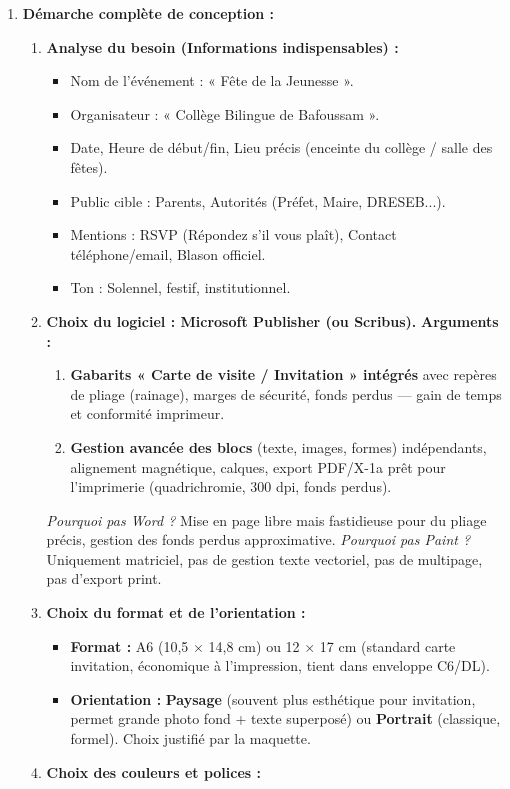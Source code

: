 \documentclass[11pt]{article}
\newcommand{\cle}[1]{{\popxbold\color{popdark}#1}}
\begin{document}
\begin{corrige}
\begin{enumerate}
\item \textbf{Démarche complète de conception :}
\begin{enumerate}
\item \textbf{Analyse du besoin (Informations indispensables) :}
\begin{itemize}
\item Nom de l'événement : « Fête de la Jeunesse ».
\item Organisateur : « Collège Bilingue de Bafoussam ».
\item Date, Heure de début/fin, Lieu précis (enceinte du collège / salle des fêtes).
\item Public cible : Parents, Autorités (Préfet, Maire, DRESEB...).
\item Mentions : RSVP (Répondez s'il vous plaît), Contact téléphone/email, Blason officiel.
\item Ton : Solennel, festif, institutionnel.
\end{itemize}
\item \textbf{Choix du logiciel : \cle{Microsoft Publisher} (ou Scribus).}
\textbf{Arguments :}
\begin{enumerate}
\item \textbf{Gabarits « Carte de visite / Invitation » intégrés} avec repères de pliage (rainage), marges de sécurité, fonds perdus — gain de temps et conformité imprimeur.
\item \textbf{Gestion avancée des blocs} (texte, images, formes) indépendants, alignement magnétique, calques, export PDF/X-1a prêt pour l'imprimerie (quadrichromie, 300 dpi, fonds perdus).
\end{enumerate}
\emph{Pourquoi pas Word ?} Mise en page libre mais fastidieuse pour du pliage précis, gestion des fonds perdus approximative. \emph{Pourquoi pas Paint ?} Uniquement matriciel, pas de gestion texte vectoriel, pas de multipage, pas d'export print.
\item \textbf{Choix du format et de l'orientation :}
\begin{itemize}
\item \textbf{Format :} A6 (10,5 $\times$ 14,8 cm) ou 12 $\times$ 17 cm (standard carte invitation, économique à l'impression, tient dans enveloppe C6/DL).
\item \textbf{Orientation :} \textbf{Paysage} (souvent plus esthétique pour invitation, permet grande photo fond + texte superposé) ou \textbf{Portrait} (classique, formel). Choix justifié par la maquette.
\end{itemize}
\item \textbf{Choix des couleurs et polices :}

\end{enumerate}
\end{enumerate}
\end{corrige}
\end{document}
